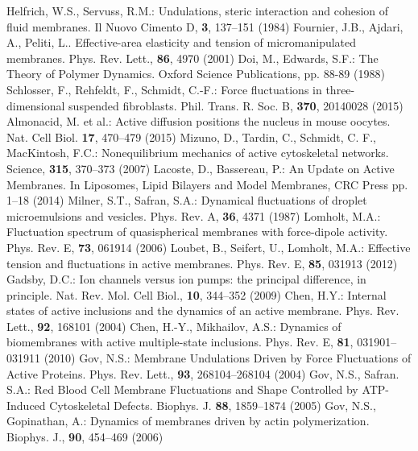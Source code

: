 \documentclass[graybox]{svmult}
\begin{document}
\begin{thebibliography}{99.}
%
Helfrich, W.S., Servuss, R.M.: Undulations, steric interaction and cohesion of fluid membranes. Il Nuovo Cimento D, \textbf{3}, 137--151 (1984)
%
Fournier, J.B., Ajdari, A., Peliti, L.. Effective-area elasticity and tension of micromanipulated membranes. Phys. Rev. Lett., \textbf{86}, 4970 (2001)
%
Doi, M., Edwards, S.F.: The Theory of Polymer Dynamics. Oxford Science Publications, pp. 88-89 (1988)
%
Schlosser, F., Rehfeldt, F., Schmidt, C.-F.: Force fluctuations in three-dimensional suspended fibroblasts. Phil. Trans. R. Soc. B, \textbf{370}, 20140028 (2015)
%
Almonacid, M. et al.: Active diffusion positions the nucleus in mouse oocytes. Nat. Cell Biol. \textbf{17}, 470--479 (2015)
%
Mizuno, D., Tardin, C., Schmidt, C. F., MacKintosh, F.C.: Nonequilibrium mechanics of active cytoskeletal networks. Science, \textbf{315}, 370--373 (2007)
%
Lacoste, D., Bassereau, P.: An Update on Active Membranes. In Liposomes, Lipid Bilayers and Model Membranes, CRC Press pp. 1--18 (2014)
%
Milner, S.T., Safran, S.A.: Dynamical fluctuations of droplet microemulsions and vesicles. Phys. Rev. A, \textbf{36}, 4371 (1987)
%
Lomholt, M.A.: Fluctuation spectrum of quasispherical membranes with force-dipole activity. Phys. Rev. E, \textbf{73}, 061914 (2006)
%
Loubet, B., Seifert, U., Lomholt, M.A.: Effective tension and fluctuations in active membranes. Phys. Rev. E, \textbf{85}, 031913 (2012)
%
Gadsby, D.C.: Ion channels versus ion pumps: the principal difference, in principle. Nat. Rev. Mol. Cell Biol., \textbf{10}, 344--352 (2009)
%
Chen, H.Y.: Internal states of active inclusions and the dynamics of an active membrane. Phys. Rev. Lett., \textbf{92}, 168101 (2004)
%
Chen, H.-Y., Mikhailov, A.S.: Dynamics of biomembranes with active multiple-state inclusions. Phys. Rev. E, \textbf{81}, 031901--031911 (2010)
%
Gov, N.S.: Membrane Undulations Driven by Force Fluctuations of Active Proteins. Phys. Rev. Lett., \textbf{93}, 268104--268104 (2004)
%
Gov, N.S., Safran. S.A.: Red Blood Cell Membrane Fluctuations and Shape Controlled by ATP-Induced Cytoskeletal Defects. Biophys. J. \textbf{88}, 1859--1874 (2005)
%
Gov, N.S., Gopinathan, A.: Dynamics of membranes driven by actin polymerization. Biophys. J., \textbf{90}, 454--469 (2006)
%

\end{thebibliography}
\end{document}
